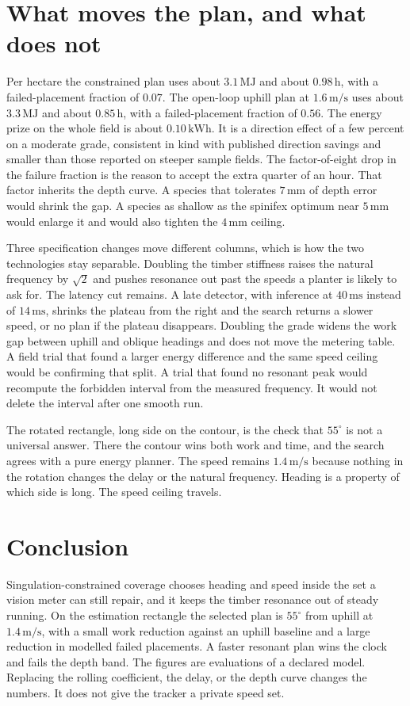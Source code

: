 \documentclass[11pt,a4paper]{article}
\begin{document}
\section{What moves the plan, and what does not}
Per hectare the constrained plan uses about \(3.1\,\mathrm{MJ}\) and about \(0.98\,\mathrm{h}\), with a failed-placement fraction of \(0.07\). The open-loop uphill plan at \(1.6\,\mathrm{m/s}\) uses about \(3.3\,\mathrm{MJ}\) and about \(0.85\,\mathrm{h}\), with a failed-placement fraction of \(0.56\). The energy prize on the whole field is about \(0.10\,\mathrm{kWh}\). It is a direction effect of a few percent on a moderate grade, consistent in kind with published direction savings and smaller than those reported on steeper sample fields. The factor-of-eight drop in the failure fraction is the reason to accept the extra quarter of an hour. That factor inherits the depth curve. A species that tolerates \(7\,\mathrm{mm}\) of depth error would shrink the gap. A species as shallow as the spinifex optimum near \(5\,\mathrm{mm}\) would enlarge it and would also tighten the \(4\,\mathrm{mm}\) ceiling.

Three specification changes move different columns, which is how the two technologies stay separable. Doubling the timber stiffness raises the natural frequency by \(\sqrt{2}\) and pushes resonance out past the speeds a planter is likely to ask for. The latency cut remains. A late detector, with inference at \(40\,\mathrm{ms}\) instead of \(14\,\mathrm{ms}\), shrinks the plateau from the right and the search returns a slower speed, or no plan if the plateau disappears. Doubling the grade widens the work gap between uphill and oblique headings and does not move the metering table. A field trial that found a larger energy difference and the same speed ceiling would be confirming that split. A trial that found no resonant peak would recompute the forbidden interval from the measured frequency. It would not delete the interval after one smooth run.

The rotated rectangle, long side on the contour, is the check that \(55^\circ\) is not a universal answer. There the contour wins both work and time, and the search agrees with a pure energy planner. The speed remains \(1.4\,\mathrm{m/s}\) because nothing in the rotation changes the delay or the natural frequency. Heading is a property of which side is long. The speed ceiling travels.

\section{Conclusion}
Singulation-constrained coverage chooses heading and speed inside the set a vision meter can still repair, and it keeps the timber resonance out of steady running. On the estimation rectangle the selected plan is \(55^\circ\) from uphill at \(1.4\,\mathrm{m/s}\), with a small work reduction against an uphill baseline and a large reduction in modelled failed placements. A faster resonant plan wins the clock and fails the depth band. The figures are evaluations of a declared model. Replacing the rolling coefficient, the delay, or the depth curve changes the numbers. It does not give the tracker a private speed set.
\end{document}
